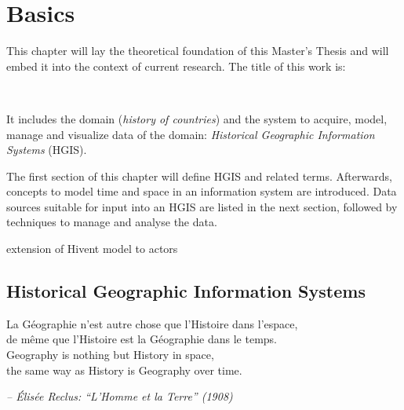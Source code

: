 

\chapter{Basics} %
\label{cha:basics}

This chapter will lay the theoretical foundation of this Master's Thesis and will embed it into the context of current research. The title of this work is:

\vspace{-1em}
\begin{center}
\textbf{\titleFirst \\ \titleSecond}
\end{center}

It includes the domain (\emph{history of countries}) and the system to acquire, model, manage and visualize data of the domain: \emph{Historical Geographic Information Systems} (HGIS).

The first section of this chapter will define HGIS and related terms. Afterwards, concepts to model time and space in an information system are introduced. Data sources suitable for input into an HGIS are listed in the next section, followed by techniques to manage and analyse the data.

extension of Hivent model to actors


\section{Historical Geographic Information Systems} %
\label{sec:historical_geographic_information_systems}

\begin{quoteit}
La Géographie n’est autre chose que l’Histoire dans l’espace, \\
de même que l’Histoire est la Géographie dans le temps. \\[1.0em]
Geography is nothing but History in space, \\
the same way as History is Geography over time.
\end{quoteit}
\hfill \textit{-- Élisée Reclus: ``L'Homme et la Terre'' (1908)}

